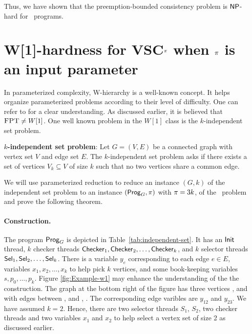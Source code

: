 Thus, we have shown that the preemption-bounded consistency problem is $\mathsf{NP}$-hard for \twowriter~programs. 




\section{W[1]-hardness for VSC$^\pi$ when $\pi$ is an input parameter}\label{sec:w1-hard}


In parameterized complexity, W-hierarchy is a well-known concept. It helps organize parameterized problems according to their level of difficulty. One can refer to  \cite{DowneyFellows1999} for a clear understanding. As discussed earlier, it is believed that $\textsc{FPT} \neq W[1]$. One well known problem in the $W[1]$ class is the $k$-independent set problem.

\textbf{$k$-independent set problem}: Let $G = (V,E)$ be a connected graph with vertex set $V$ and edge set $E$. The $k$-independent set problem asks if there exists a set of vertices $V_k \subseteq V$ of size $k$ such that no two vertices share a common edge.

We will use parameterized reduction to reduce an instance $(G, k)$ of the independent set problem to an instance $(\mathsf{Prog}_G, \pi)$ with $\pi = 3k$, of the \vscp\ problem and prove the following theorem. 

\wonehardness*


\paragraph*{Construction.} The program $\mathsf{Prog}_G$ is depicted in Table~\ref{tab:independent-set}. It has an $\mathsf{Init}$ thread, $k$ checker threads $\mathsf{Checker}_1, \mathsf{Checker}_2, \dots, \mathsf{Checker}_k$, and $k$ selector threads $\mathsf{Sel}_1, \mathsf{Sel}_2, \dots, \mathsf{Sel}_k$. There is a variable $y_e$ corresponding to each edge $e \in E$, variables $x_1, x_2, \dots, x_k$ to help pick $k$ vertices, and some book-keeping variables $s, p_0, \dots, p_k$. Figure \ref{fig:Example-w1} may  enhance the understanding of the the construction. The graph at the bottom right of the figure has three vertices ,  and  with edges between ,  and , . The corresponding edge  varibles are $y_{12}$ and $y_{23}$. We have assumed $k=2$. Hence,  there are two selector threads $S_1$, $S_2$, two checker threads and two variables $x_1$ and $x_2$ to help select a vertex set of size 2 as discussed earlier.

